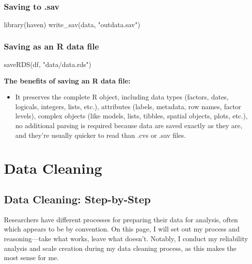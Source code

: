 \documentclass[
  letterpaper,
  DIV=11,
  numbers=noendperiod]{scrreprt}
\newenvironment{Shaded}{\begin{snugshade}}{\end{snugshade}}
\newcommand{\FunctionTok}[1]{\textcolor[rgb]{0.28,0.35,0.67}{#1}}
\newcommand{\NormalTok}[1]{\textcolor[rgb]{0.00,0.23,0.31}{#1}}
\newcommand{\StringTok}[1]{\textcolor[rgb]{0.13,0.47,0.30}{#1}}
\providecommand{\tightlist}{%
  \setlength{\itemsep}{0pt}\setlength{\parskip}{0pt}}\usepackage{longtable,booktabs,array}
\begin{document}
\section{Saving to .sav}\label{saving-to-.sav}

\begin{Shaded}
\begin{Highlighting}[]
\FunctionTok{library}\NormalTok{(haven)}
\FunctionTok{write\_sav}\NormalTok{(data, }\StringTok{"outdata.sav"}\NormalTok{)}
\end{Highlighting}
\end{Shaded}

\section{Saving as an R data file}\label{saving-as-an-r-data-file}

\begin{Shaded}
\begin{Highlighting}[]
\FunctionTok{saveRDS}\NormalTok{(df, }\StringTok{"data/data.rds"}\NormalTok{)}
\end{Highlighting}
\end{Shaded}

\textbf{The benefits of saving an R data file:}

\begin{itemize}
\tightlist
\item
  It preserves the complete R object, including data types (factors,
  dates, logicals, integers, lists, etc.), attributes (labels, metadata,
  row names, factor levels), complex objects (like models, lists,
  tibbles, spatial objects, plots, etc.), no additional parsing is
  required because data are saved exactly as they are, and they're
  usually quicker to read than .cvs or .sav files.
\end{itemize}

\part{Data Cleaning}

\chapter{Data Cleaning: Step-by-Step}\label{data-cleaning-step-by-step}

Researchers have different processes for preparing their data for
analysis, often which appears to be by convention. On this page, I will
set out my process and reasoning---take what works, leave what doesn't.
Notably, I conduct my reliability analysis and scale creation during my
data cleaning process, as this makes the most sense for me.
\end{document}
